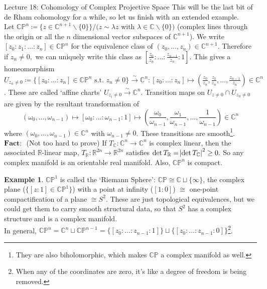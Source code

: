 \documentclass[10pt]{article}
\theoremstyle{plain}
\theoremstyle{definition}
\newtheorem{exmp}[thm]{Example} %
\newcommand{\st}{\text{ s.t. }}
\newcommand{\Fact}{\textbf{Fact: }}
\newcommand{\Real}{\mathbb{R}}
\newcommand{\CProj}{\mathbb{CP}}
\newcommand{\remzero}{\backslash \{0\}}
\begin{document}
\begin{section}{Lecture 18: Cohomology of Complex Projective Space}
This will be the last bit of de Rham cohomology for a while, so let us finish with an extended example.\\
Let $\CProj^n \coloneqq \{z\in\mathbb{C}^{n+1} \remzero\} / (z\sim \lambda z $ with $\lambda \in \mathbb{C} \remzero)$ (complex lines through the origin or all the $n$ dimensional vector subspaces of $\mathbb{C}^{n+1}$). We write $[z_0: z_1: \ldots : z_n] \in \CProj^n$ for the equivalence class of $(z_0,\ldots,z_n) \in \mathbb{C}^{n+1}$. Therefore if $z_n\neq 0,$ we can uniquely write this class as $[\frac{z_0}{z_n}: \ldots : \frac{z_{n-1}}{z_n} : 1 ].$ This gives a homeomorphism $U_{z_n\neq 0} \coloneqq \{ [ z_0 : \ldots : z_n] \in \CProj ^n \st z_n \neq 0\} \xrightarrow[]{\sim} \mathbb{C}^n: [z_0 : \ldots: z_n ] \mapsto (\frac{z_0}{z_n},\frac{z_1}{z_n},\ldots,\frac{z_{n-1}}{z_n}) \in \mathbb{C}^n$. These are called `affine charts' $U_{z_i\neq0} \xrightarrow[]{\sim} \mathbb{C}^n$. Transition maps on $U_{z\neq 0} \cap U_{z_n \neq 0} $ are given by the resultant transformation of 
$$(\omega_0,\ldots,\omega_{n-1}) \mapsto [\omega_0:\ldots : \omega_{n-1} : 1 ] \mapsto \left(\frac{\omega_0}{\omega_{n-1}}, \frac{\omega_1}{\omega_{n-1}},\ldots,\frac{1}{\omega_{n-1}}\right) \in \mathbb{C}^n$$
where $(\omega_0 , \ldots, \omega_{n-1}) \in \mathbb{C}^n$ with $\omega_{n-1}\neq 0$. These transitions are smooth\footnote{They are also biholomorphic, which makes $\CProj$ a complex manifold as well.}.\\
$\Fact$ (Not too hard to prove) If $T_\mathbb{C} : \mathbb{C}^n \to \mathbb{C}^n$ is complex linear, then the associated $\Real$-linear map, $T_\Real : \Real^{2n} \to \Real^{2n}$ satisfies $\det T_\Real = \abs{\det T_\mathbb{C}}^2 \geq 0.$ So any complex manifold is an orientable real manifold. Also, $\CProj^n$ is compact.
\begin{exmp}
$\CProj^1$ is called the `Riemann Sphere': $\CProj \cong \mathbb{C} \sqcup \{\infty\}$, the complex plane ($\{[z:1]\in\CProj^1\}$) with a point at infinity ($[1:0]$) $\cong$ one-point compactification of a plane $\cong S^2$. These are just topological equivalences, but we could get them to carry smooth structural data, so that $S^2$ has a complex structure and is a complex manifold. \\
In general, $\CProj^n = \mathbb{C}^n \sqcup \CProj^{n-1} = \{[z_0:\ldots:z_{n-1}:1]\} \sqcup \{[z_0:\ldots:z_{n-1}:0]\}$\footnote{When any of the coordinates are zero, it's like a degree of freedom is being removed.}.
\end{exmp}


\end{section}
\end{document}
